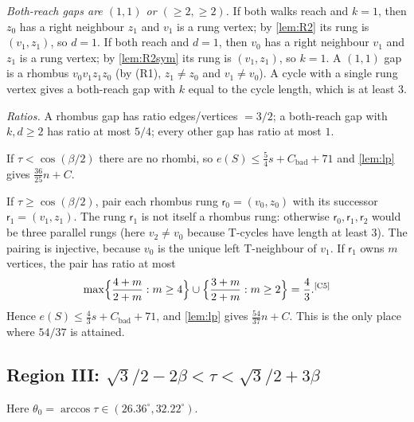 \documentclass[11pt]{amsart}
\theoremstyle{definition}
\theoremstyle{remark}
\newcommand{\chk}[1]{\textsuperscript{[#1]}}
\begin{document}
\emph{Both-reach gaps are $(1,1)$ or $(\ge2,\ge2)$.} If both walks reach and $k=1$, then $z_0$ has a right neighbour $z_1$ and $v_1$ is a rung vertex; by \cref{lem:R2} its rung is $(v_1,z_1)$, so $d=1$. If both reach and $d=1$, then $v_0$ has a right neighbour $v_1$ and $z_1$ is a rung vertex; by \cref{lem:R2sym} its rung is $(v_1,z_1)$, so $k=1$. A $(1,1)$ gap is a rhombus $v_0v_1z_1z_0$ (by (R1), $z_1\neq z_0$ and $v_1\neq v_0$). A cycle with a single rung vertex gives a both-reach gap with $k$ equal to the cycle length, which is at least $3$.

\emph{Ratios.} A rhombus gap has ratio edges/vertices $=3/2$; a both-reach gap with $k,d\ge2$ has ratio at most $5/4$; every other gap has ratio at most $1$.

If $\tau<\cos(\beta/2)$ there are no rhombi, so $e(S)\le\frac54s+C_{\mathrm{bad}}+71$ and \cref{lem:lp} gives $\frac{36}{25}n+C$.

If $\tau\ge\cos(\beta/2)$, pair each rhombus rung $\mathsf r_0=(v_0,z_0)$ with its successor $\mathsf r_1=(v_1,z_1)$. The rung $\mathsf r_1$ is not itself a rhombus rung: otherwise $\mathsf r_0,\mathsf r_1,\mathsf r_2$ would be three parallel rungs (here $v_2\neq v_0$ because T-cycles have length at least $3$). The pairing is injective, because $v_0$ is the unique left T-neighbour of $v_1$. If $\mathsf r_1$ owns $m$ vertices, the pair has ratio at most
\[
\max\Bigl\{\frac{4+m}{2+m}: m\ge4\Bigr\}\cup\Bigl\{\frac{3+m}{2+m}: m\ge2\Bigr\}=\frac43 .\chk{C5}
\]
Hence $e(S)\le\frac43s+C_{\mathrm{bad}}+71$, and \cref{lem:lp} gives $\frac{54}{37}n+C$. This is the only place where $54/37$ is attained.

\subsection{Region III: \texorpdfstring{$\sqrt3/2-2\beta<\tau<\sqrt3/2+3\beta$}{sqrt3/2 - 2 beta < tau < sqrt3/2 + 3 beta}}\label{sec:regionIII}
Here $\theta_0=\arccos\tau\in(26.36^\circ,32.22^\circ)$.
\end{document}
